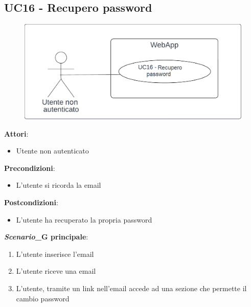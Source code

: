 \subsection{UC16 - Recupero password} \label{usecase:16}
\begin{figure}[H]
    \centering
    \includegraphics[width=0.9\linewidth]{ucd/ucd16.png}
\end{figure}
\textbf{Attori}:
\begin{itemize}
    \item Utente non autenticato
\end{itemize}
\textbf{Precondizioni}:
\begin{itemize}
    \item L'utente si ricorda la email
\end{itemize}
\textbf{Postcondizioni}:
\begin{itemize}
    \item L'utente ha recuperato la propria password
\end{itemize}
\textbf{\textit{Scenario}_G principale}:
\begin{enumerate}
    \item L'utente inserisce l'email
    \item L'utente riceve una email
    \item L'utente, tramite un link nell'email accede ad una sezione che permette il cambio password
\end{enumerate}
\newpage
